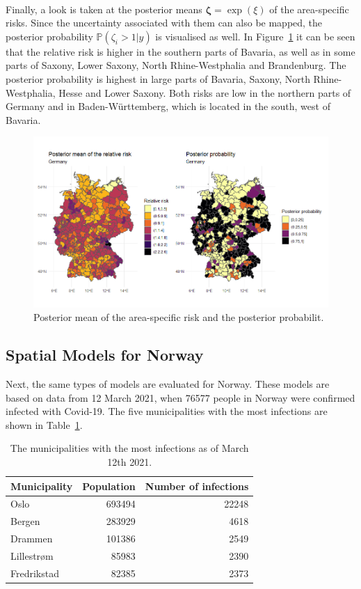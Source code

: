 \\
Finally, a look is taken at the posterior means $\pmb{\zeta} = \exp{\left(\xi\right)}$ of the area-specific risks. Since the uncertainty associated with them can also be mapped, the posterior probability $\mathbb{P}\left(\zeta_i > 1|y\right)$ is visualised as well. In Figure~\ref{posteriorGermany} it can be seen that the relative risk is higher in the southern parts of Bavaria, as well as in some parts of Saxony, Lower Saxony, North Rhine-Westphalia and Brandenburg. The posterior probability is highest in large parts of Bavaria, Saxony, North Rhine-Westphalia, Hesse and Lower Saxony. Both risks are low in the northern parts of Germany and in Baden-Württemberg, which is located in the south, west of Bavaria.
\begin{figure}[H]
    \centering
    \includegraphics[width = \textwidth]{posterior_germany.png}
    \caption{Posterior mean of the area-specific risk and the posterior probabilit.}
    \label{posteriorGermany}
\end{figure}
%     
\subsection{Spatial Models for Norway}
Next, the same types of models are evaluated for Norway. These models are based on data from 12 March 2021, when 76577 people in Norway were confirmed infected with Covid-19. The five municipalities with the most infections are shown in Table~\ref{top5norway}.
\begin{table}[H] 
\caption{The municipalities with the most infections as of March 12th 2021. \label{top5norway}}
\begin{tabular}{l r r}
\toprule
\textbf{Municipality}	& \textbf{Population}	& \textbf{Number of infections} \\
\midrule
Oslo & 693494 & 22248 \\
Bergen & 283929 & 4618 \\
Drammen & 101386 & 2549 \\
Lillestrøm & 85983 & 2390 \\
Fredrikstad & 82385 & 2373 \\
\bottomrule
\end{tabular}
\end{table}
